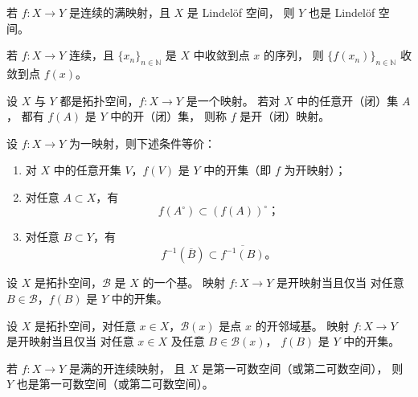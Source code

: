 \begin{theorem}[定理 3.9]
若 $f:X\to Y$ 是连续的满映射，且 $X$ 是 Lindel\"of 空间，
则 $Y$ 也是 Lindel\"of 空间。
\end{theorem}

\begin{theorem}
若 $f:X\to Y$ 连续，且 $\{x_n\}_{n\in\mathbb{N}}$ 是 $X$ 中收敛到点 $x$ 的序列，
则 $\{f(x_n)\}_{n\in\mathbb{N}}$ 收敛到点 $f(x)$。
\end{theorem}

\begin{definition}[定义 3.3（开（闭）映射——限制的是原像到像）]
设 $X$ 与 $Y$ 都是拓扑空间，$f:X\to Y$ 是一个映射。
若对 $X$ 中的任意开（闭）集 $A$，
都有 $f(A)$ 是 $Y$ 中的开（闭）集，
则称 $f$ 是开（闭）映射。
\end{definition}

\begin{theorem}[定理 3.12（开映射的等价刻画）]
设 $f:X\to Y$ 为一映射，则下述条件等价：
\begin{enumerate}
  \item 对 $X$ 中的任意开集 $V$，$f(V)$ 是 $Y$ 中的开集（即 $f$ 为开映射）；
  \item 对任意 $A\subset X$，有
  \[
  f(A^\circ)\subset (f(A))^\circ；
  \]
  \item 对任意 $B\subset Y$，有
  \[
  f^{-1}(\overline{B})\subset \overline{f^{-1}(B)}。
  \]
\end{enumerate}
\end{theorem}

\begin{theorem}
设 $X$ 是拓扑空间，$\mathcal{B}$ 是 $X$ 的一个基。
映射 $f:X\to Y$ 是开映射当且仅当
对任意 $B\in\mathcal{B}$，$f(B)$ 是 $Y$ 中的开集。
\end{theorem}

\begin{theorem}[定理 3.14]
设 $X$ 是拓扑空间，对任意 $x\in X$，$\mathcal{B}(x)$ 是点 $x$ 的开邻域基。
映射 $f:X\to Y$ 是开映射当且仅当
对任意 $x\in X$ 及任意 $B\in\mathcal{B}(x)$，
$f(B)$ 是 $Y$ 中的开集。
\end{theorem}

\begin{theorem}[定理 3.15（满 + 开 + 连续保持可数性）]
若 $f:X\to Y$ 是满的开连续映射，
且 $X$ 是第一可数空间（或第二可数空间），
则 $Y$ 也是第一可数空间（或第二可数空间）。
\end{theorem}

